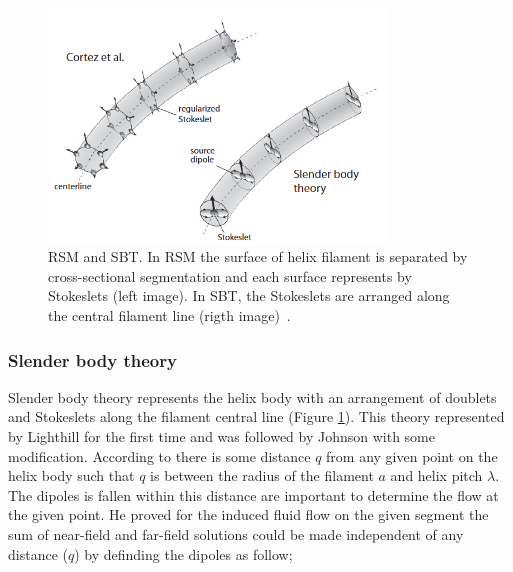 \documentclass[12pt,a4paper,titlepage]{report}
\begin{document}
\begin{figure}
  \centering
    \includegraphics[width=0.80\textwidth]{Stoks}
  \caption[RSM and SBT]{\ac*{RSM} and \ac*{SBT}. In \ac*{RSM} the surface of helix filament is separated by 
cross-sectional segmentation and each surface represents by 
Stokeslets (left image). In \ac*{SBT}, the Stokeslets are arranged along the 
central filament line (rigth image)~\citep{rodenborn2013propulsion}.}
  \label{Stoks}
\end{figure}




\subsubsection{Slender body theory}\label{method1}





Slender body theory represents the helix body with an arrangement of
 doublets and Stokeslets along the filament central line (Figure \ref{Stoks}). This theory represented by 
Lighthill for the first time and was followed by Johnson with some modification. According to \citeauthor{lighthill1971large}
there is some distance $q$ from any given point on the helix body such that $q$ is between the radius of the
filament $a$ and helix pitch $\lambda$. The dipoles is fallen within this distance are important to determine the flow at the
given point. He proved for the induced fluid flow on the given segment 
the sum of near-field and far-field solutions could be made independent of any distance ($q$) by definding
the dipoles as follow;
\end{document}
